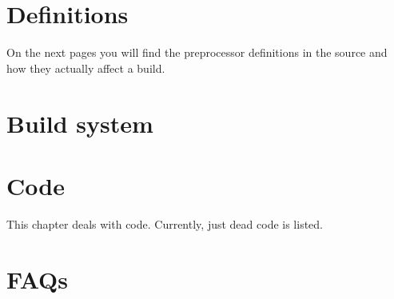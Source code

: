 \documentclass[a4paper,11pt]{book}
\begin{document}
\newpage
\appendix
\chapter{Definitions\label{cha:definitions}}
On the next pages you will find the preprocessor definitions in the source and how they actually affect a build.


\chapter{Build system\label{cha:buildsystem}}


\chapter{Code\label{cha:code}}
This chapter deals with code. Currently, just dead code is listed.

\chapter{FAQs}
\newcommand{\addquestion}[2]{\begin{subsection}{#1}
#2\\
\end{subsection}
}



\newpage
\backmatter
\end{document}
